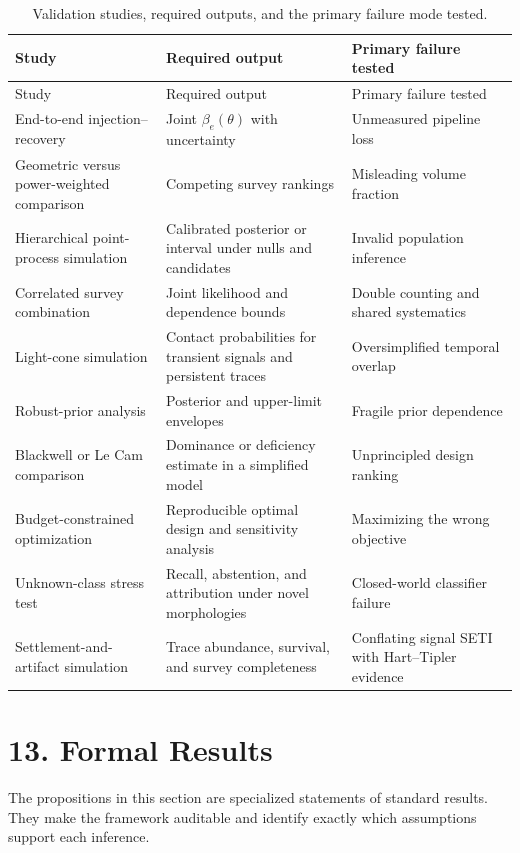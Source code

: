 \documentclass[11pt,a4paper]{article}
\begin{document}
\begin{longtable}[]{@{}Q{0.25\textwidth}Q{0.31\textwidth}Q{0.32\textwidth}@{}}
\caption{Validation studies, required outputs, and the primary failure mode tested.}\label{tab:validation}\\
\toprule\noalign{}
Study & Required output & Primary failure tested \\
\midrule\noalign{}
\endfirsthead
\toprule\noalign{}
Study & Required output & Primary failure tested \\
\midrule\noalign{}
\endhead
\bottomrule\noalign{}
\endlastfoot
End-to-end injection--recovery & Joint \(\beta_e(\theta)\) with uncertainty & Unmeasured pipeline loss \\
Geometric versus power-weighted comparison & Competing survey rankings & Misleading volume fraction \\
Hierarchical point-process simulation & Calibrated posterior or interval under nulls and candidates & Invalid population inference \\
Correlated survey combination & Joint likelihood and dependence bounds & Double counting and shared systematics \\
Light-cone simulation & Contact probabilities for transient signals and persistent traces & Oversimplified temporal overlap \\
Robust-prior analysis & Posterior and upper-limit envelopes & Fragile prior dependence \\
Blackwell or Le Cam comparison & Dominance or deficiency estimate in a simplified model & Unprincipled design ranking \\
Budget-constrained optimization & Reproducible optimal design and sensitivity analysis & Maximizing the wrong objective \\
Unknown-class stress test & Recall, abstention, and attribution under novel morphologies & Closed-world classifier failure \\
Settlement-and-artifact simulation & Trace abundance, survival, and survey completeness & Conflating signal SETI with Hart--Tipler evidence \\
\end{longtable}

\section{13. Formal Results}\label{13-formal-results}

The propositions in this section are specialized statements of standard results. They make the framework auditable and identify exactly which assumptions support each inference.
\end{document}
